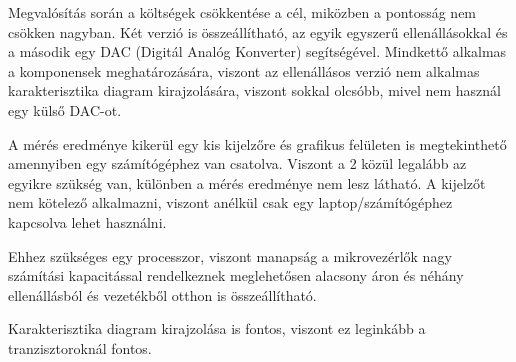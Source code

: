 Megvalósítás során a költségek csökkentése a cél, miközben a pontosság nem csökken nagyban. 
Két verzió is összeállítható, az egyik egyszerű ellenállásokkal és a második egy DAC (Digitál 
Analóg Konverter) segítségével. Mindkettő alkalmas a komponensek meghatározására, viszont az 
ellenállásos verzió nem alkalmas karakterisztika diagram kirajzolására, viszont sokkal olcsóbb, 
mivel nem használ egy külső DAC-ot.

A mérés eredménye kikerül egy kis kijelzőre és grafikus felületen is megtekinthető amennyiben 
egy számítógéphez van csatolva. Viszont a 2 közül legalább az egyikre szükség van, különben a 
mérés eredménye nem lesz látható. A kijelzőt nem kötelező alkalmazni, viszont anélkül csak 
egy laptop/számítógéphez kapcsolva lehet használni.

Ehhez szükséges egy processzor, viszont manapság a mikrovezérlők nagy számítási kapacitással 
rendelkeznek meglehetősen alacsony áron és néhány ellenállásból és vezetékből otthon is 
összeállítható.

Karakterisztika diagram kirajzolása is fontos, viszont ez leginkább a tranzisztoroknál 
fontos.